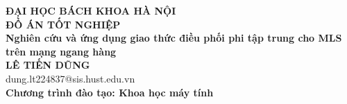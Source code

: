 \documentclass[DoAn.tex]{subfiles}
\begin{document}
\begin{titlepage}
\thispagestyle{empty}
\begin{center}

{\textbf{\large{ĐẠI HỌC BÁCH KHOA HÀ NỘI}}}\\[2cm]

{\textbf{\huge{ ĐỒ ÁN TỐT NGHIỆP}}}\\[1cm]
{\textbf{\Large{Nghiên cứu và ứng dụng giao thức điều phối phi tập trung cho MLS trên mạng ngang hàng}}}\\[1cm]

{\textbf{\large{LÊ TIẾN DŨNG}}}\\
{\large{dung.lt224837@sis.hust.edu.vn}}\\[0.5cm]

{\textbf{\large{Chương trình đào tạo: Khoa học máy tính}}}\\

\vspace{2cm}
\begin{table}[H]
\centering
{}
\end{table}
\end{center}



\end{titlepage}
\end{document}
